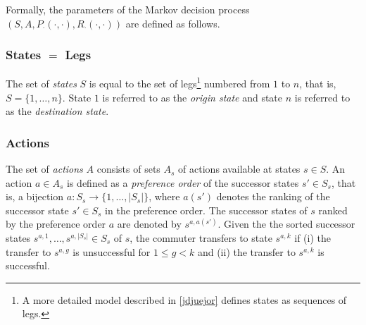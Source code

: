 \documentclass[dissertation,draft*]{aaltoseries}
\begin{document}
Formally, the parameters of the Markov decision process $(S,A,P_{\cdot}(\cdot,\cdot),R_{\cdot}(\cdot,\cdot))$ are defined as follows.

\subsubsection{States $=$ Legs}
\label{statesdef}
The set of \emph{states} $S$ is equal to the set of 
legs\footnote{A more detailed model described in \ref{jdjuejor} defines states as sequences of legs.} numbered from $1$ to $n$, that is, $S= \{1,\ldots,n\}$.
State $1$ is referred to as the \emph{origin state} and state $n$ is referred to as the \emph{destination state}.



\subsubsection{Actions}
\label{actionsdef}
The set of \emph{actions} $A$ consists of sets $A_s$ of actions available at states $s \in S$.
An action $a \in A_s$ is defined as a \emph{preference order} of the successor states $s' \in S_s$, 
that is, a bijection $a:S_s \to \{1,\ldots,|S_s|\}$, where $a(s')$ denotes the ranking of the successor state $s' \in S_s$
in the preference order. The successor states of $s$ ranked by the preference order $a$ are denoted by $s^{a,a(s')}$.
Given the the sorted successor states $s^{a,1}, \ldots, s^{a,|S_s|} \in S_{s}$ of $s$, 
the commuter transfers to state $s^{a,k}$ if 
(i)
the transfer to $s^{a,g}$ is unsuccessful for $1 \leq g < k$ and 
(ii)
the transfer to $s^{a,k}$ is successful.
\end{document}
